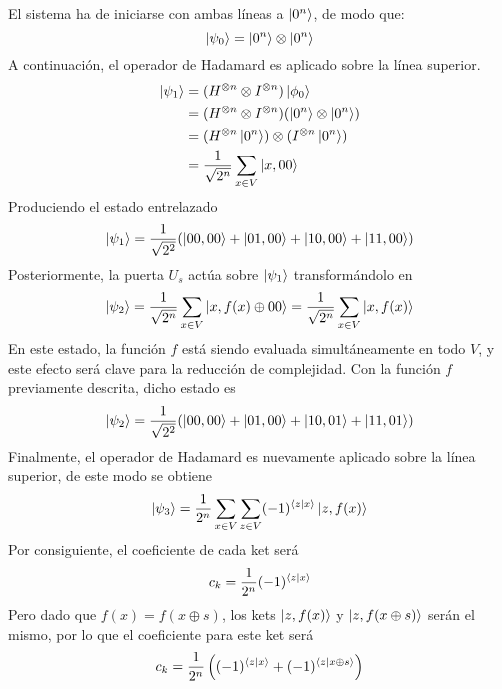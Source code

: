 \documentclass{article}
\theoremstyle{definition}
\begin{document}
El sistema ha de iniciarse con ambas líneas a $\ket{0^n}$, de modo que:
%
$$ \ket{\psi_0} = \ket{0^n} \otimes \ket{0^n} $$
%
A continuación, el operador de Hadamard es aplicado sobre la línea superior.
%
\begin{equation}
\begin{split}
\ket{\psi_1} & = (H^{\otimes n} \otimes I^{\otimes n}) \ket{\phi_0} \\
	& = (H^{\otimes n} \otimes I^{\otimes n}) (\ket{0^n} \otimes \ket{0^n}) \\
	& = (H^{\otimes n} \ket{0^n}) \otimes (I^{\otimes n} \ket{0^n}) \\
	& = \frac{1}{\sqrt{2^n}} \sum_{x \in V} \ket{x, 00}
\end{split}
\end{equation}
%
Produciendo el estado entrelazado
%
\begin{equation}
\ket{\psi_1} = \frac{1}{\sqrt{2^2}} (\ket{00,00} + \ket{01,00} + \ket{10,00} + 
\ket{11,00})
\end{equation}
%
Posteriormente, la puerta $U_s$ actúa sobre $\ket{\psi_1}$ transformándolo en
%
\begin{equation}
\ket{\psi_2} = \frac{1}{\sqrt{2^n}} \sum_{x \in V} \ket{x, f(x) \oplus 00} = 
\frac{1}{\sqrt{2^n}} \sum_{x \in V} \ket{x, f(x)}
\end{equation}
%
En este estado, la función $f$ está siendo evaluada simultáneamente en todo $V$, 
y este efecto será clave para la reducción de complejidad. Con la función $f$ 
previamente descrita, dicho estado es
%
\begin{equation}
\ket{\psi_2} = \frac{1}{\sqrt{2^2}} (\ket{00,00} + \ket{01,00} + \ket{10,01} + 
\ket{11,01})
\end{equation}
%
Finalmente, el operador de Hadamard es nuevamente aplicado sobre la línea 
superior, de este modo se obtiene
\begin{equation}
\ket{\psi_3} = \frac{1}{2^n} \sum_{x \in V} \sum_{z \in V}
	(-1)^{\braket{z|x}} \ket{z, f(x)}
\end{equation}
%
Por consiguiente, el coeficiente de cada ket será
%
\begin{equation}
c_k = \frac{1}{2^n} (-1)^{\braket{z|x}}
\end{equation}
%
Pero dado que $f(x) = f(x \oplus s)$, los kets $\ket{z, f(x)}$ y $\ket{z, f(x 
\oplus s)}$ serán el mismo, por lo que el coeficiente para este ket será
%
\begin{equation}
c_k = \frac{1}{2^n} \left((-1)^{\braket{z|x}} + (-1)^{\braket{z|x \oplus 
s}}\right)
\end{equation}
\end{document}
